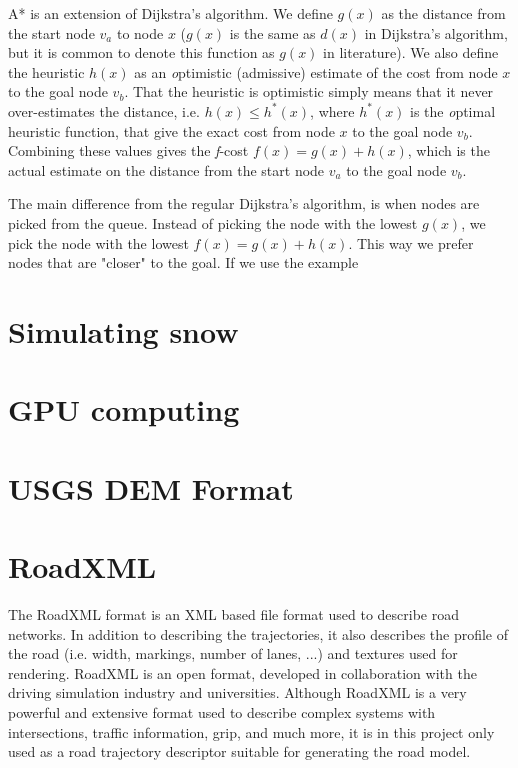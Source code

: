 A* is an extension of Dijkstra's algorithm. We define $g(x)$ as the distance from the start node $v_a$ to node $x$ ($g(x)$ is the same as $d(x)$ in Dijkstra's algorithm, but it is common to denote this function as $g(x)$ in literature). We also define the heuristic $h(x)$ as an {\textit optimistic} (admissive) estimate of the cost from node $x$ to the goal node $v_b$. That the heuristic is optimistic simply means that it never over-estimates the distance, i.e. $h(x) \leq h^*(x)$, where $h^*(x)$ is the {\textit optimal} heuristic function, that give the exact cost from node $x$ to the goal node $v_b$. Combining these values gives the {\textit f-cost} $f(x) = g(x)+h(x)$, which is the actual estimate on the distance from the start node $v_a$ to the goal node $v_b$.

The main difference from the regular Dijkstra's algorithm, is when nodes are picked from the queue. Instead of picking the node with the lowest $g(x)$, we pick the node with the lowest $f(x) = g(x) + h(x)$. This way we prefer nodes that are "closer" to the goal. If we use the example 

\section{Simulating snow}

\section{GPU computing}

\section{USGS DEM Format}

\section{RoadXML}
The RoadXML format is an XML based file format used to describe road networks. In addition to describing the trajectories, it also describes the profile of the road (i.e. width, markings, number of lanes, ...) and textures used for rendering.\cite{roadxml} RoadXML is an open format, developed in collaboration with the driving simulation industry and universities. Although RoadXML is a very powerful and extensive format used to describe complex systems with intersections, traffic information, grip, and much more, it is in this project only used as a road trajectory descriptor suitable for generating the road model.


